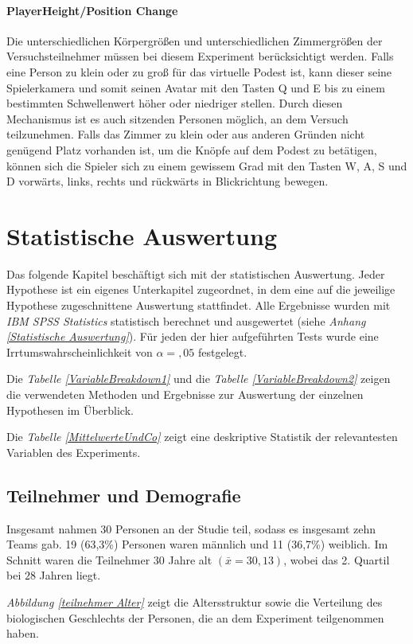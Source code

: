 \documentclass[a4paper,11pt]{article}%
\renewcommand{\\}{\vspace*{0.5\baselineskip} \newline}
\begin{document}
\paragraph{PlayerHeight/Position Change}
Die unterschiedlichen Körpergrößen und unterschiedlichen Zimmergrößen der Versuchsteilnehmer müssen bei diesem Experiment berücksichtigt werden. Falls eine Person zu klein oder zu groß für das virtuelle Podest ist, kann dieser seine Spielerkamera und somit seinen Avatar mit den Tasten Q und E bis zu einem bestimmten Schwellenwert höher oder niedriger stellen. Durch diesen Mechanismus ist es auch sitzenden Personen möglich, an dem Versuch teilzunehmen. Falls das Zimmer zu klein oder aus anderen Gründen nicht genügend Platz vorhanden ist, um die Knöpfe auf dem Podest zu betätigen, können sich die Spieler sich zu einem gewissem Grad mit den Tasten W, A, S und D vorwärts, links, rechts und rückwärts in Blickrichtung bewegen.

\newpage	
\section{Statistische Auswertung}
Das folgende Kapitel beschäftigt sich mit der statistischen Auswertung. Jeder Hypothese ist ein eigenes Unterkapitel zugeordnet, in dem eine auf die jeweilige Hypothese zugeschnittene Auswertung stattfindet. Alle Ergebnisse wurden mit \textit{IBM SPSS Statistics} statistisch berechnet und ausgewertet (siehe \textit{Anhang \ref{Statistische Auswertung}}). 
Für jeden der hier aufgeführten Tests wurde eine Irrtumswahrscheinlichkeit von  $\alpha =,05$ festgelegt.

Die \textit{Tabelle \ref{VariableBreakdown1}} und die \textit{Tabelle \ref{VariableBreakdown2}} zeigen die verwendeten Methoden und Ergebnisse zur Auswertung der einzelnen Hypothesen im Überblick.

Die \textit{Tabelle \ref{MittelwerteUndCo}} zeigt eine deskriptive Statistik der relevantesten Variablen des Experiments.
	\subsection{Teilnehmer und Demografie}
Insgesamt nahmen 30 Personen an der Studie teil, sodass es insgesamt zehn Teams gab. 19 (63,3\%) Personen waren männlich und 11 (36,7\%) weiblich. Im Schnitt waren die Teilnehmer 30 Jahre alt $(\bar{x} = 30,13)$, wobei das 2. Quartil bei $28$ Jahren liegt.

\textit{Abbildung \ref{teilnehmer Alter}} zeigt die Altersstruktur sowie die Verteilung des biologischen Geschlechts der Personen, die an dem Experiment teilgenommen haben. 
\end{document}
